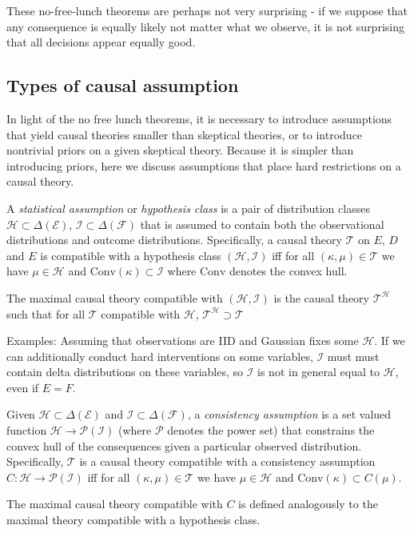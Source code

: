 These no-free-lunch theorems are perhaps not very surprising - if we suppose that any consequence is equally likely not matter what we observe, it is not surprising that all decisions appear equally good. 

\subsection{Types of causal assumption}

In light of the no free lunch theorems, it is necessary to introduce assumptions that yield causal theories smaller than skeptical theories, or to introduce nontrivial priors on a given skeptical theory. Because it is simpler than introducing priors, here we discuss assumptions that place hard restrictions on a causal theory.

\begin{definition}
A \emph{statistical assumption} or \emph{hypothesis class} is a pair of distribution classes $\mathscr{H}\subset \Delta(\mathcal{E})$, $\mathscr{I}\subset \Delta(\mathcal{F})$ that is assumed to contain both the observational distributions and outcome distributions. Specifically, a causal theory $\mathscr{T}$ on $E$, $D$ and $E$ is compatible with a hypothesis class $(\mathscr{H},\mathscr{I})$ iff for all $(\kappa,\mu)\in \mathscr{T}$ we have $\mu\in \mathscr{H}$ and $\mathrm{Conv}(\kappa)\subset \mathscr{I}$ where $\mathrm{Conv}$ denotes the convex hull.

The maximal causal theory compatible with $(\mathscr{H},\mathscr{I})$ is the causal theory $\mathscr{T}^\mathscr{H}$ such that for all $\mathscr{T}$ compatible with $\mathscr{H}$, $\mathscr{T}^{\mathscr{H}}\supset \mathscr{T}$
\end{definition}

Examples: Assuming that observations are IID and Gaussian fixes some $\mathscr{H}$. If we can additionally conduct hard interventions on some variables, $\mathscr{I}$ must must contain delta distributions on these variables, so $\mathscr{I}$ is not in general equal to $\mathscr{H}$, even if $E=F$.

\begin{definition}
Given $\mathscr{H}\subset\Delta(\mathcal{E})$ and $\mathscr{I}\subset\Delta(\mathcal{F})$, a \emph{consistency assumption} is a set valued function $\mathscr{H}\to \mathscr{P}(\mathscr{I})$ (where $\mathscr{P}$ denotes the power set) that constrains the convex hull of the consequences given a particular observed distribution. Specifically, $\mathscr{T}$ is a causal theory compatible with a consistency assumption $C:\mathscr{H}\to \mathscr{P}(\mathscr{I})$ iff for all $(\kappa,\mu)\in \mathscr{T}$ we have $\mu\in \mathscr{H}$ and  $\mathrm{Conv}(\kappa)\subset C(\mu)$.

The maximal causal theory compatible with $C$ is defined analogously to the maximal theory compatible with a hypothesis class.
\end{definition}

